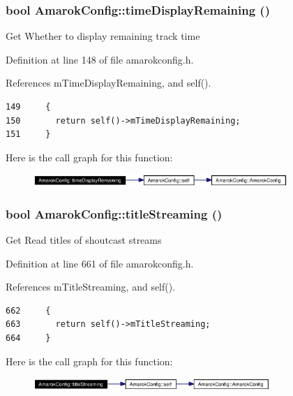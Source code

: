 \subsubsection{\setlength{\rightskip}{0pt plus 5cm}bool Amarok\-Config::time\-Display\-Remaining ()\hspace{0.3cm}{\tt  [inline, static]}}\label{classAmarokConfig_AmarokConfige14}


Get Whether to display remaining track time 

Definition at line 148 of file amarokconfig.h.

References m\-Time\-Display\-Remaining, and self().



\footnotesize\begin{verbatim}149     {
150       return self()->mTimeDisplayRemaining;
151     }
\end{verbatim}\normalsize 


Here is the call graph for this function:\begin{figure}[H]
\begin{center}
\leavevmode
\includegraphics[width=273pt]{classAmarokConfig_AmarokConfige14_cgraph}
\end{center}
\end{figure}
\subsubsection{\setlength{\rightskip}{0pt plus 5cm}bool Amarok\-Config::title\-Streaming ()\hspace{0.3cm}{\tt  [inline, static]}}\label{classAmarokConfig_AmarokConfige68}


Get Read titles of shoutcast streams 

Definition at line 661 of file amarokconfig.h.

References m\-Title\-Streaming, and self().



\footnotesize\begin{verbatim}662     {
663       return self()->mTitleStreaming;
664     }
\end{verbatim}\normalsize 


Here is the call graph for this function:\begin{figure}[H]
\begin{center}
\leavevmode
\includegraphics[width=254pt]{classAmarokConfig_AmarokConfige68_cgraph}
\end{center}
\end{figure}
